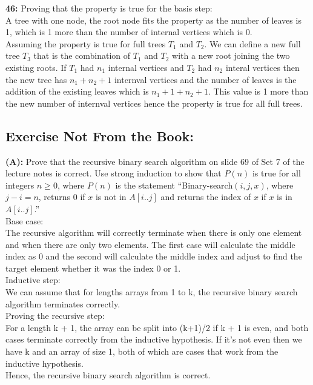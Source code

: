 \documentclass[12pt]{article}  %
\begin{document}
\noindent
{\bf 46:}
Proving that the property is true for the basis step:\\
A tree with one node, the root node fits the property as the number of
leaves is 1, which is 1 more than the number of internal vertices which is 
0. 
\\
Assuming the property is true for full trees $T_{1}$ and $T_{2}$. We can define a new 
full tree $T_{3}$ that is the combination of $T_{1}$ and $T_{2}$ with a new 
root joining the two existing roots. If $T_{1}$ had $n_{1}$ internal vertices 
and $T_{2}$ had $n_{2}$ interal vertices then the new tree has 
$n_{1} + n_{2} + 1$ internval vertices and the number of leaves is the addition 
of the existing leaves which is $n_{1} + 1 + n_{2} + 1$. This value is 1 more 
than the new number of internval vertices hence the property is true for all 
full trees.

\subsection*{Exercise Not From the Book:}

\noindent
{\bf (A):}  Prove that the recursive binary search algorithm on slide 69
of Set 7 of the lecture notes is correct.  Use strong induction to show
that $P(n)$ is true for all integers $n \ge 0$, where $P(n)$ is the statement
``Binary-search$(i,j,x)$, where $j-i= n$, returns 0 if $x$ is not in $A[i..j]$
and returns the index of $x$ if $x$ is in $A[i..j]$.''
\\
Base case: 
\\
The recursive algorithm will correctly terminate when there is only one element and when 
there are only two elements. The first case will calculate the middle index 
as 0 and the second will calculate the middle index and adjust to find the 
target element whether it was the index 0 or 1. 
\\
Inductive step:
\\
We can assume that for lengths arrays from 1 to k, the recursive binary search 
algorithm terminates correctly.
\\
Proving the recursive step:
\\
For a length k + 1, the array can be split into (k+1)/2 if k + 1 is even,
and both cases terminate correctly from the inductive hypothesis. If it's not 
even then we have k and an array of size 1, both of which are cases
that work from the inductive hypothesis.
\\
Hence, the recursive binary search algorithm is correct.
\end{document}
